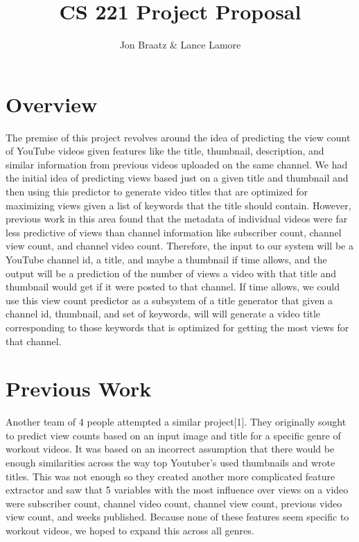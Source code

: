 \documentclass[12pt]{article}
\title{CS 221 Project Proposal}
\author{Jon Braatz \& Lance Lamore}
\theoremstyle{definition}
\theoremstyle{remark}
\begin{document}
\maketitle


\section{Overview}

The premise of this project revolves around the idea of predicting the view
count of YouTube videos given features like the title, thumbnail, description,
and similar information from previous videos uploaded on the same channel. We
had the initial idea of predicting views based just on a given title and
thumbnail and then using this predictor to generate video titles that are
optimized for maximizing views given a list of keywords that the title should
contain. However, previous work in this area found that the metadata of
individual videos were far less predictive of views than channel information
like subscriber count, channel view count, and channel video count. Therefore,
the input to our system will be a YouTube channel id, a title, and maybe a
thumbnail if time allows, and the output will be a prediction of the number of
views a video with that title and thumbnail would get if it were posted to that
channel. If time allows, we could use this view count predictor as a subsystem
of a title generator that given a channel id, thumbnail, and set of keywords,
will will generate a video title corresponding to those keywords that is
optimized for getting the most views for that channel.


\section{Previous Work}
Another team of 4 people attempted a similar project[1]. They originally sought to
predict view counts based on an input image and title for a specific genre of
workout videos. It was based on an incorrect assumption that there would be enough 
similarities across the way top Youtuber's used thumbnails and wrote titles. This 
was not enough so they created another more complicated feature extractor and saw 
that 5 variables with the most influence over views on a video were subscriber 
count, channel video count, channel view count, previous video view count, and 
weeks published. Because none of these features seem specific to workout videos, we
hoped to expand this across all genres. 
\end{document}
